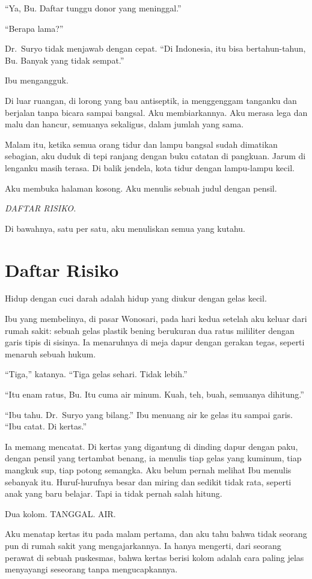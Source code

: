 \documentclass[11pt,twoside,openany]{book}
\begin{document}
``Ya, Bu. Daftar tunggu donor yang meninggal.''

``Berapa lama?''

Dr.~Suryo tidak menjawab dengan cepat. ``Di Indonesia, itu bisa bertahun-tahun, Bu. Banyak yang tidak sempat.''

Ibu mengangguk.

Di luar ruangan, di lorong yang bau antiseptik, ia menggenggam tanganku dan berjalan tanpa bicara sampai bangsal. Aku membiarkannya. Aku merasa lega dan malu dan hancur, semuanya sekaligus, dalam jumlah yang sama.

Malam itu, ketika semua orang tidur dan lampu bangsal sudah dimatikan sebagian, aku duduk di tepi ranjang dengan buku catatan di pangkuan. Jarum di lenganku masih terasa. Di balik jendela, kota tidur dengan lampu-lampu kecil.

Aku membuka halaman kosong. Aku menulis sebuah judul dengan pensil.

\emph{DAFTAR RISIKO.}

Di bawahnya, satu per satu, aku menuliskan semua yang kutahu.

\chapter{Daftar Risiko}
Hidup dengan cuci darah adalah hidup yang diukur dengan gelas kecil.

Ibu yang membelinya, di pasar Wonosari, pada hari kedua setelah aku keluar dari rumah sakit: sebuah gelas plastik bening berukuran dua ratus mililiter dengan garis tipis di sisinya. Ia menaruhnya di meja dapur dengan gerakan tegas, seperti menaruh sebuah hukum.

``Tiga,'' katanya. ``Tiga gelas sehari. Tidak lebih.''

``Itu enam ratus, Bu. Itu cuma air minum. Kuah, teh, buah, semuanya dihitung.''

``Ibu tahu. Dr.~Suryo yang bilang.'' Ibu menuang air ke gelas itu sampai garis. ``Ibu catat. Di kertas.''

Ia memang mencatat. Di kertas yang digantung di dinding dapur dengan paku, dengan pensil yang tertambat benang, ia menulis tiap gelas yang kuminum, tiap mangkuk sup, tiap potong semangka. Aku belum pernah melihat Ibu menulis sebanyak itu. Huruf-hurufnya besar dan miring dan sedikit tidak rata, seperti anak yang baru belajar. Tapi ia tidak pernah salah hitung.

Dua kolom. TANGGAL. AIR.

Aku menatap kertas itu pada malam pertama, dan aku tahu bahwa tidak seorang pun di rumah sakit yang mengajarkannya. Ia hanya mengerti, dari seorang perawat di sebuah puskesmas, bahwa kertas berisi kolom adalah cara paling jelas menyayangi seseorang tanpa mengucapkannya.
\end{document}
